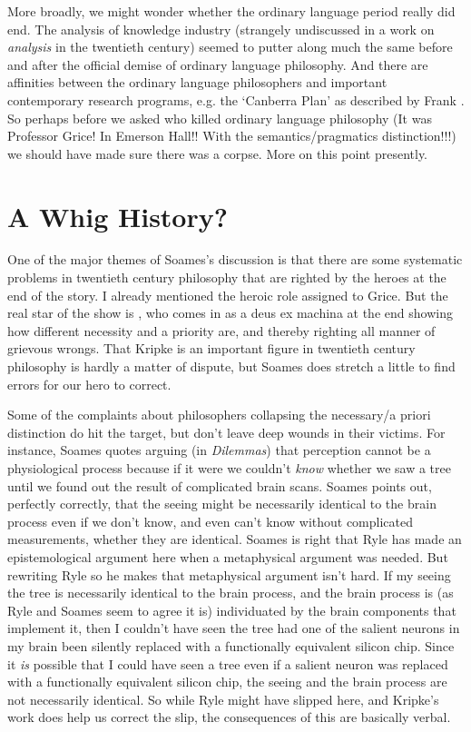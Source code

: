 More broadly, we might wonder whether the ordinary language period really did end. The analysis of knowledge industry (strangely undiscussed in a work on \textit{analysis} in the twentieth century) seemed to putter along much the same before and after the official demise of ordinary language philosophy. And there are affinities between the ordinary language philosophers and important contemporary research programs, e.g. the `Canberra Plan' as described by Frank \citet{Jackson1998}. So perhaps before we asked who killed ordinary language philosophy (It was Professor Grice! In Emerson Hall!! With the semantics/pragmatics distinction!!!) we should have made sure there was a corpse. More on this point presently.

\section{A Whig History?}

One of the major themes of Soames's discussion is that there are some systematic problems in twentieth century philosophy that are righted by the heroes at the end of the story. I already mentioned the heroic role assigned to Grice. But the real star of the show is \citeauthor{Kripke1980}, who comes in as a deus ex machina at the end showing how different necessity and a priority are, and thereby righting all manner of grievous wrongs. That Kripke is an important figure in twentieth century philosophy is hardly a matter of dispute, but Soames does stretch a little to find errors for our hero to correct.

Some of the complaints about philosophers collapsing the necessary/a priori distinction do hit the target, but don't leave deep wounds in their victims. For instance, Soames quotes \citeauthor{Ryle1954} arguing (in \textit{Dilemmas}) that perception cannot be a physiological process because if it were we couldn't \textit{know} whether we saw a tree until we found out the result of complicated brain scans. Soames points out, perfectly correctly, that the seeing might be necessarily identical to the brain process even if we don't know, and even can't know without complicated measurements, whether they are identical. Soames is right that Ryle has made an epistemological argument here when a metaphysical argument was needed. But rewriting Ryle so he makes that metaphysical argument isn't hard. If my seeing the tree is necessarily identical to the brain process, and the brain process is (as Ryle and Soames seem to agree it is) individuated by the brain components that implement it, then I couldn't have seen the tree had one of the salient neurons in my brain been silently replaced with a functionally equivalent silicon chip. Since it \textit{is} possible that I could have seen a tree even if a salient neuron was replaced with a functionally equivalent silicon chip, the seeing and the brain process are not necessarily identical. So while Ryle might have slipped here, and Kripke's work does help us correct the slip, the consequences of this are basically verbal.

